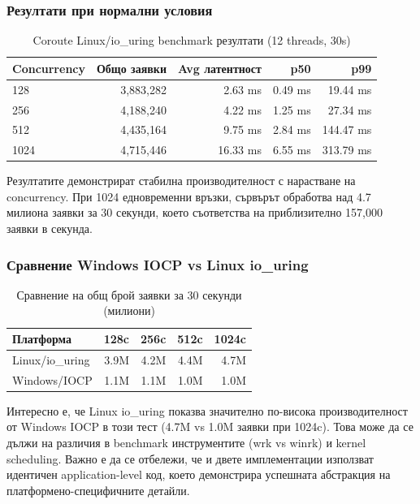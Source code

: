 \subsubsection{Резултати при нормални условия}

\begin{table}[H]
\centering
\caption{Coroute Linux/io\_uring benchmark резултати (12 threads, 30s)}
\label{tab:linux_benchmark}
\begin{tabular}{|l|r|r|r|r|}
\hline
\textbf{Concurrency} & \textbf{Общо заявки} & \textbf{Avg латентност} & \textbf{p50} & \textbf{p99} \\
\hline
128 & 3,883,282 & 2.63 ms & 0.49 ms & 19.44 ms \\
256 & 4,188,240 & 4.22 ms & 1.25 ms & 27.34 ms \\
512 & 4,435,164 & 9.75 ms & 2.84 ms & 144.47 ms \\
1024 & 4,715,446 & 16.33 ms & 6.55 ms & 313.79 ms \\
\hline
\end{tabular}
\end{table}

Резултатите демонстрират стабилна производителност с нарастване на concurrency. При 1024 едновременни връзки, сървърът обработва над 4.7 милиона заявки за 30 секунди, което съответства на приблизително 157,000 заявки в секунда.

\subsubsection{Сравнение Windows IOCP vs Linux io\_uring}

\begin{table}[H]
\centering
\caption{Сравнение на общ брой заявки за 30 секунди (милиони)}
\label{tab:platform_comparison}
\begin{tabular}{|l|r|r|r|r|}
\hline
\textbf{Платформа} & \textbf{128c} & \textbf{256c} & \textbf{512c} & \textbf{1024c} \\
\hline
Linux/io\_uring & 3.9M & 4.2M & 4.4M & 4.7M \\
Windows/IOCP & 1.1M & 1.1M & 1.0M & 1.0M \\
\hline
\end{tabular}
\end{table}

Интересно е, че Linux io\_uring показва значително по-висока производителност от Windows IOCP в този тест (4.7M vs 1.0M заявки при 1024c). Това може да се дължи на различия в benchmark инструментите (wrk vs winrk) и kernel scheduling. Важно е да се отбележи, че и двете имплементации използват идентичен application-level код, което демонстрира успешната абстракция на платформено-специфичните детайли.

